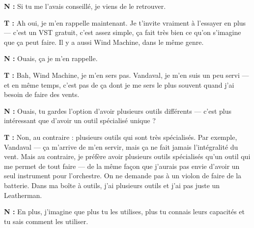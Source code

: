 ﻿\documentclass[12pt]{article}
\begin{document}
\textbf{N :} Si tu me l'avais conseillé, je viens de le retrouver. 

\textbf{T :} Ah oui, je m'en rappelle maintenant. Je t'invite vraiment à l'essayer en plus — c'est un VST gratuit, c'est assez simple, ça fait très bien ce qu'on s'imagine que ça peut faire. Il y a aussi Wind Machine, dans le même genre. 

\textbf{N :} Ouais, ça je m'en rappelle. 

\textbf{T :} Bah, Wind Machine, je m'en sers pas. Vandaval, je m'en suis un peu servi — et en même temps, c'est pas de ça dont je me sers le plus souvent quand j'ai besoin de faire des vents. 

\textbf{N :} Ouais, tu gardes l'option d'avoir plusieurs outils différents — c'est plus intéressant que d'avoir un outil spécialisé unique ? 

\textbf{T :} Non, au contraire : plusieurs outils qui sont très spécialisés. Par exemple, Vandaval — ça m'arrive de m'en servir, mais ça ne fait jamais l'intégralité du vent. Mais au contraire, je préfère avoir plusieurs outils spécialisés qu'un outil qui me permet de tout faire — de la même façon que j'aurais pas envie d'avoir un seul instrument pour l'orchestre. On ne demande pas à un violon de faire de la batterie. Dans ma boîte à outils, j'ai plusieurs outils et j'ai pas juste un Leatherman. 

\textbf{N :} En plus, j'imagine que plus tu les utilises, plus tu connais leurs capacités et tu sais comment les utiliser. 
\end{document}
